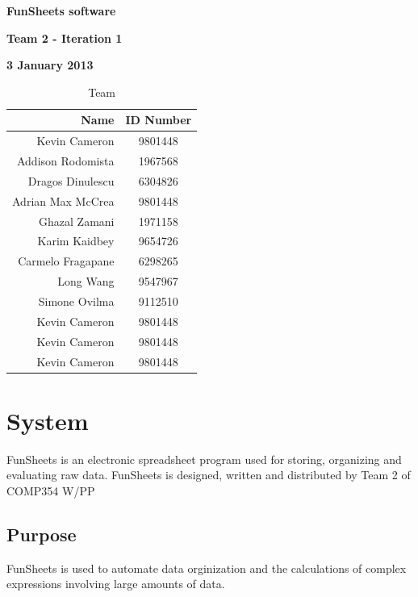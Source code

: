 \documentclass[12pt]{article}
\begin{document}
\vspace*{0.5in}
\centerline{\bf\Large FunSheets software}

\vspace*{0.5in}
\centerline{\bf\Large Team 2 - Iteration 1}

\vspace*{0.5in}
\centerline{\bf\Large 3 January 2013}

\vspace*{1.5in}
\begin{table}[htbp]
\caption{Team}
\begin{center}
\begin{tabular}{|r | c|}
\hline
Name & ID Number \\\hline\hline
Kevin Cameron & 9801448 \\\hline\hline
Addison Rodomista & 1967568 \\\hline\hline
Dragos Dinulescu & 6304826 \\\hline\hline
Adrian Max McCrea & 9801448 \\\hline\hline
Ghazal Zamani & 1971158 \\\hline\hline
Karim Kaidbey & 9654726 \\\hline\hline
Carmelo Fragapane & 6298265 \\\hline\hline
Long Wang & 9547967 \\\hline\hline
Simone Ovilma & 9112510 \\\hline\hline
Kevin Cameron & 9801448 \\\hline\hline
Kevin Cameron & 9801448 \\\hline\hline
Kevin Cameron & 9801448 \\\hline
\end{tabular}
\end{center}
\end{table}

\clearpage

\section{System}
FunSheets is an electronic spreadsheet program used for storing, organizing and evaluating raw data. FunSheets is designed, written and distributed by Team 2 of COMP354 W/PP

\subsection{Purpose}
FunSheets is used to automate data orginization and the calculations of complex expressions involving large amounts of data.
\end{document}
